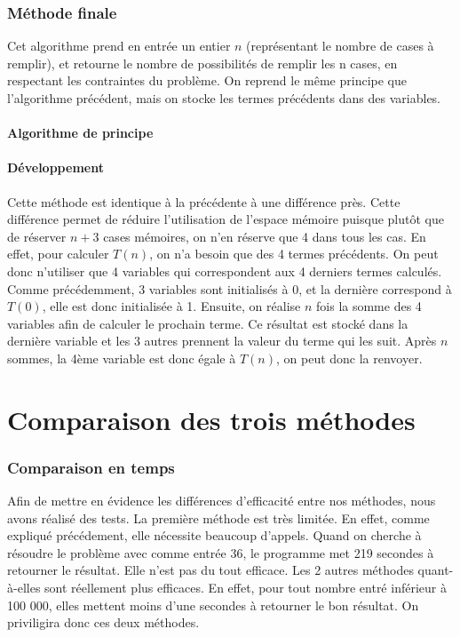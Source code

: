 \documentclass{article}
\begin{document}
\section{Méthode finale}

Cet algorithme prend en entrée un entier $n$ (représentant le nombre de cases à remplir), et retourne le nombre de possibilités de remplir les n cases, en respectant les contraintes du problème. On reprend le même principe que l'algorithme précédent, mais on stocke les termes précédents dans des variables.

\subsection{Algorithme de principe}



\subsection{Développement}
Cette méthode est identique à la précédente à une différence près. Cette différence permet de réduire l'utilisation de l'espace mémoire puisque plutôt que de réserver $n+3$ cases mémoires, on n'en réserve que 4 dans tous les cas. En effet, pour calculer $T(n)$, on n'a besoin que des 4 termes précédents. On peut donc n'utiliser que 4 variables qui correspondent aux 4 derniers termes calculés. Comme précédemment, 3 variables sont initialisés à 0, et la dernière correspond à $T(0)$, elle est donc initialisée à 1. Ensuite, on réalise $n$ fois la somme des 4 variables afin de calculer le prochain terme. Ce résultat est stocké dans la dernière variable et les 3 autres prennent la valeur du terme qui les suit. Après $n$ sommes, la 4ème variable est donc égale à $T(n)$, on peut donc la renvoyer.
\newpage
\part{Comparaison des trois méthodes}
\section{Comparaison en temps}
Afin de mettre en évidence les différences d'efficacité entre nos méthodes, nous avons réalisé des tests. La première méthode est très limitée. En effet, comme expliqué précédement, elle nécessite beaucoup d'appels. Quand on cherche à résoudre le problème avec comme entrée 36, le programme met 219 secondes à retourner le résultat. Elle n'est pas du tout efficace. Les 2 autres méthodes quant-à-elles sont réellement plus efficaces. En effet, pour tout nombre entré inférieur à 100 000, elles mettent moins d'une secondes à retourner le bon résultat. On priviligira donc ces deux méthodes.
\end{document}
